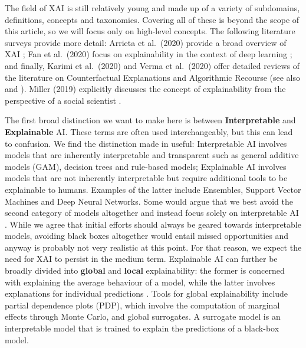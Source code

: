 \documentclass[
  letterpaper,
  DIV=11,
  numbers=noendperiod]{scrartcl}
\begin{document}
The field of XAI is still relatively young and made up of a variety of
subdomains, definitions, concepts and taxonomies. Covering all of these
is beyond the scope of this article, so we will focus only on high-level
concepts. The following literature surveys provide more detail: Arrieta
et al.~(2020) provide a broad overview of XAI
\cite{arrieta2020explainable}; Fan et al.~(2020) focus on explainability
in the context of deep learning \cite{fan2020interpretability}; and
finally, Karimi et al.~(2020) \cite{karimi2020survey} and Verma et
al.~(2020) \cite{verma2020counterfactual} offer detailed reviews of the
literature on Counterfactual Explanations and Algorithmic Recourse (see
also \cite{molnar2020interpretable} and \cite{varshney2022trustworthy}).
Miller (2019) explicitly discusses the concept of explainability from
the perspective of a social scientist \cite{miller2019explanation}.

The first broad distinction we want to make here is between
\textbf{Interpretable} and \textbf{Explainable} AI. These terms are
often used interchangeably, but this can lead to confusion. We find the
distinction made in \cite{rudin2019stop} useful: Interpretable AI
involves models that are inherently interpretable and transparent such
as general additive models (GAM), decision trees and rule-based models;
Explainable AI involves models that are not inherently interpretable but
require additional tools to be explainable to humans. Examples of the
latter include Ensembles, Support Vector Machines and Deep Neural
Networks. Some would argue that we best avoid the second category of
models altogether and instead focus solely on interpretable AI
\cite{rudin2019stop}. While we agree that initial efforts should always
be geared towards interpretable models, avoiding black boxes altogether
would entail missed opportunities and anyway is probably not very
realistic at this point. For that reason, we expect the need for XAI to
persist in the medium term. Explainable AI can further be broadly
divided into \textbf{global} and \textbf{local} explainability: the
former is concerned with explaining the average behaviour of a model,
while the latter involves explanations for individual predictions
\cite{molnar2020interpretable}. Tools for global explainability include
partial dependence plots (PDP), which involve the computation of
marginal effects through Monte Carlo, and global surrogates. A surrogate
model is an interpretable model that is trained to explain the
predictions of a black-box model.
\end{document}
